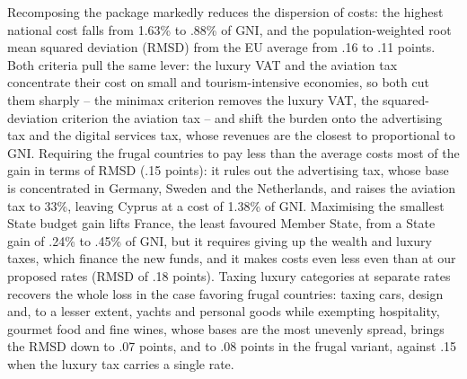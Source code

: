 \documentclass[a4paper, 11pt]{article}
\begin{document}
Recomposing the package markedly reduces the dispersion of costs: the highest national cost falls from 1.63\% to .88\% of GNI, and the population-weighted root mean squared deviation (RMSD) from the EU average from .16 to .11 points. Both criteria pull the same lever: the luxury VAT and the aviation tax concentrate their cost on small and tourism-intensive economies, so both cut them sharply -- the minimax criterion removes the luxury VAT, the squared-deviation criterion the aviation tax -- and shift the burden onto the advertising tax and the digital services tax, whose revenues are the closest to proportional to GNI. Requiring the frugal countries to pay less than the average costs most of the gain in terms of RMSD (.15 points): it rules out the advertising tax, whose base is concentrated in Germany, Sweden and the Netherlands, and raises the aviation tax to 33\%, leaving Cyprus at a cost of 1.38\% of GNI. Maximising the smallest State budget gain lifts France, the least favoured Member State, from a State gain of .24\% to .45\% of GNI, but it requires giving up the wealth and luxury taxes, which finance the new funds, and it makes costs even less even than at our proposed rates (RMSD of .18 points). Taxing luxury categories at separate rates recovers the whole loss in the case favoring frugal countries: taxing cars, design and, to a lesser extent, yachts and personal goods while exempting hospitality, gourmet food and fine wines, whose bases are the most unevenly spread, brings the RMSD down to .07 points, and to .08 points in the frugal variant, against .15 when the luxury tax carries a single rate.
\end{document}
